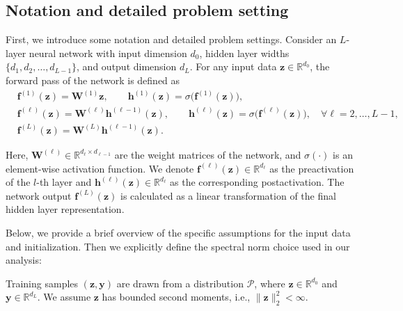 
\subsection{Notation and detailed problem setting}
\label{sec:notation_L_layer}

First, we introduce some notation and detailed problem settings. Consider an $L$-layer neural network with input dimension $d_0$, hidden layer widths $\{d_1, d_2, \dots, d_{L-1}\}$, and output dimension $d_L$. For any input data $\mathbf{z} \in \mathbb{R}^{d_0}$, the forward pass of the network is defined as
\begin{equation}
\begin{split}
    & \mathbf{f}^{(1)}(\mathbf{z}) = \mathbf{W}^{(1)} \mathbf{z}, 
    \qquad 
    \mathbf{h}^{(1)}(\mathbf{z}) = \sigma\bigl(\mathbf{f}^{(1)}(\mathbf{z})\bigr),\\
    &\mathbf{f}^{(\ell)}(\mathbf{z}) = \mathbf{W}^{(\ell)} \mathbf{h}^{(\ell-1)}(\mathbf{z}), 
    \qquad 
    \mathbf{h}^{(\ell)}(\mathbf{z}) = \sigma\bigl(\mathbf{f}^{(\ell)}(\mathbf{z})\bigr), 
    \quad \forall \ell = 2, \dots, L-1,\\
    &\mathbf{f}^{(L)}(\mathbf{z}) = \mathbf{W}^{(L)} \mathbf{h}^{(\ell-1)}(\mathbf{z}).
    \label{eq:L_layer_net}
\end{split}
\end{equation}

Here, $\mathbf{W}^{(\ell)} \in \mathbb{R}^{d_{\ell} \times d_{\ell-1}}$ are the weight matrices of the network, and $\sigma(\cdot)$ is an element-wise activation function. 
We denote $\mathbf{f}^{(\ell)}(\mathbf{z}) \in \mathbb{R}^{d_{\ell}}$ as the preactivation of the $l$-th layer and $\mathbf{h}^{(\ell)}(\mathbf{z}) \in \mathbb{R}^{d_{\ell}}$ as the corresponding postactivation.
The network output $\mathbf{f}^{(L)}(\mathbf{z})$ is calculated as a linear transformation of the final hidden layer representation.


Below, we provide a brief overview of the specific assumptions for the input data and initialization. Then we explicitly define the spectral norm choice used in our analysis:

\begin{assumption}
\label{assumption:input_data}
Training samples $(\mathbf{z}, \mathbf{y})$ are drawn from a distribution $\mathcal{P}$, 
where $\mathbf{z} \in \mathbb{R}^{d_0}$ and $\mathbf{y} \in \mathbb{R}^{d_L}$. 
We assume $\mathbf{z}$ has bounded second moments, 
i.e., $\|\mathbf{z}\|^2_2< \infty$.
\end{assumption}

